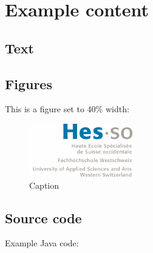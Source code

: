 \documentclass[a4paper,11pt]{report}
\begin{document}

\chapter{Example content}

\section{Text}

\blindtext

\blinditemize

\blindtext

\blindenumerate

\blindtext

\blinddescription

\blindtext


\section{Figures}

This is a figure set to 40\% width:

\begin{figure}[H]
    \centering
    \includegraphics[width=0.4\textwidth]{img/logo_hes-so}
    
    \caption{Caption}
\end{figure}

\section{Source code}

Example Java code:
\end{document}
